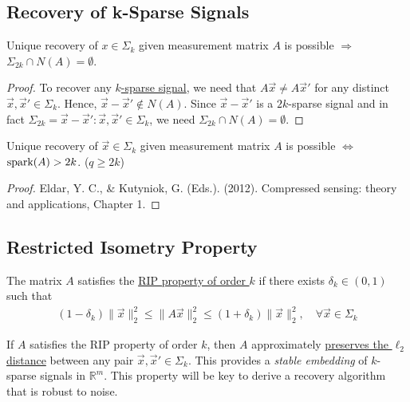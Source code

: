 \documentclass[11pt]{elegantbook}
\begin{document}
\subsection{Recovery of k-Sparse Signals}
\begin{lemma}
    Unique recovery of $x \in \Sigma_k$ given measurement matrix $A$ is possible $\Rightarrow$ $\Sigma_{2k} \cap N(A) = \emptyset$.
\end{lemma}
\begin{proof}
    To recover any \underline{$k$-sparse signal}, we need that $A\vec{x} \neq A\vec{x}'$ for any distinct $\vec{x},\vec{x}' \in \Sigma_k$. Hence, $\vec{x}-\vec{x}' \notin N(A)$. Since $\vec{x}-\vec{x}'$ is a $2k$-sparse signal and in fact $\Sigma_{2k} ={\vec{x}-\vec{x}' : \vec{x},\vec{x}'\in \Sigma_k}$, we need $\Sigma_{2k} \cap N(A) = \emptyset$.
\end{proof}

\begin{theorem}
    Unique recovery of $\vec{x} \in \Sigma_k$ given measurement matrix $A$ is possible $\Leftrightarrow$ $\textnormal{spark}(A)> 2k$. ($q\geq 2k$)
\end{theorem}
\begin{proof}
Eldar, Y. C., \& Kutyniok, G. (Eds.). (2012). Compressed sensing: theory and applications, Chapter 1.
\end{proof}

\subsection{Restricted Isometry Property}
\begin{definition}
    The matrix $A$ satisfies the \underline{RIP property of order $k$} if there exists $\delta_k \in (0, 1)$ such that
    \begin{equation}
        \begin{aligned}
            (1-\delta_k)\|\vec{x}\|^2_2\leq\|A\vec{x}\|_2^2\leq (1+\delta_k)\|\vec{x}\|^2_2,\quad \forall \vec{x}\in \Sigma_k
        \end{aligned}
        \nonumber
    \end{equation}
\end{definition}
If $A$ satisfies the RIP property of order $k$, then $A$ approximately \underline{preserves the $\ell_2$ distance} between any pair $\vec{x},\vec{x}' \in \Sigma_k$. This provides a \textit{stable embedding} of $k$-sparse signals in $\mathbb{R}^m$. This property will be key to derive a recovery algorithm that is robust to noise.
\end{document}

